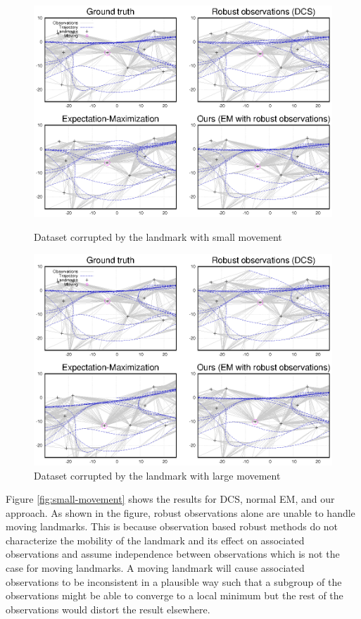 \begin{figure}[ht]
\centering
\begin{minipage}[b]{0.48\textwidth}
  \includegraphics[width=\textwidth]{fig/small-movement}
  \caption{Dataset corrupted by the landmark with small movement}
  \label{fig:small-movement}
\end{minipage}
\quad
\begin{minipage}[b]{0.48\textwidth}
  \includegraphics[width=\textwidth]{fig/large-movement}
  \caption{Dataset corrupted by the landmark with large movement}
  \label{fig:large-movement}
\end{minipage}
\end{figure}

Figure \ref{fig:small-movement} shows the results for DCS, normal EM, and our
approach. As shown in the figure, robust observations alone are unable to
handle moving landmarks. This is because observation based robust methods do
not characterize the mobility of the landmark and its effect on associated
observations and assume independence between observations which is not the case
for moving landmarks. A moving landmark will cause associated observations to
be inconsistent in a plausible way such that a subgroup of the observations
might be able to converge to a local minimum but the rest of the observations
would distort the result elsewhere. 

